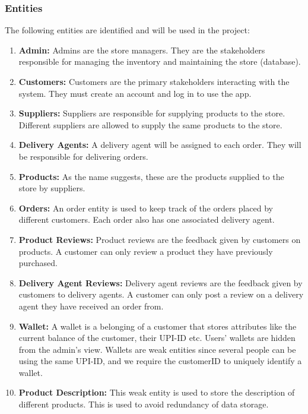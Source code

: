 \subsubsection*{Entities}
    The following entities are identified and will be used in the project:
    \begin{enumerate}
        \item \textbf{Admin:}
        Admins are the store managers.
        They are the stakeholders responsible for managing the inventory and maintaining the store (database).
        \item \textbf{Customers:}
        Customers are the primary stakeholders interacting with the system.
        They must create an account and log in to use the app.
        \item \textbf{Suppliers:}
        Suppliers are responsible for supplying products to the store.
        Different suppliers are allowed to supply the same products to the store.
        \item \textbf{Delivery Agents:}
        A delivery agent will be assigned to each order.
        They will be responsible for delivering orders.
        \item \textbf{Products:}
        As the name suggests, these are the products supplied to the store by suppliers.
        \item \textbf{Orders:}
        An order entity is used to keep track of the orders placed by different customers.
        Each order also has one associated delivery agent.
        \item \textbf{Product Reviews:}
        Product reviews are the feedback given by customers on products.
        A customer can only review a product they have previously purchased.
        \item \textbf{Delivery Agent Reviews:}
        Delivery agent reviews are the feedback given by customers to delivery agents.
        A customer can only post a review on a delivery agent they have received an order from.
        \item \textbf{Wallet:}
        A wallet is a belonging of a customer that stores attributes like the current balance of the customer, their UPI-ID etc.
        Users' wallets are hidden from the admin's view. Wallets are weak entities since several people can be using the same UPI-ID,
        and we require the customerID to uniquely identify a wallet.
        \item \textbf{Product Description:}
        This weak entity is used to store the description of different products.
        This is used to avoid redundancy of data storage.
    \end{enumerate}

